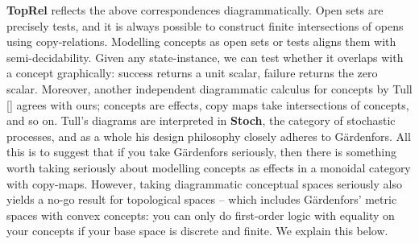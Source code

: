 \begin{fullwidth}
\textbf{TopRel} reflects the above correspondences diagrammatically. Open sets are precisely tests, and it is always possible to construct finite intersections of opens using copy-relations. Modelling concepts as open sets or tests aligns them with semi-decidability. Given any state-instance, we can test whether it overlaps with a concept graphically: success returns a unit scalar, failure returns the zero scalar. Moreover, another independent diagrammatic calculus for concepts by Tull [] agrees with ours; concepts are effects, copy maps take intersections of concepts, and so on. Tull's diagrams are interpreted in \textbf{Stoch}, the category of stochastic processes, and as a whole his design philosophy closely adheres to G\"{a}rdenfors. All this is to suggest that if you take G\"{a}rdenfors seriously, then there is something worth taking seriously about modelling concepts as effects in a monoidal category with copy-maps. However, taking diagrammatic conceptual spaces seriously also yields a no-go result for topological spaces -- which includes G\"{a}rdenfors' metric spaces with convex concepts: you can only do first-order logic with equality on your concepts if your base space is discrete and finite. We explain this below.\\


\end{fullwidth}

